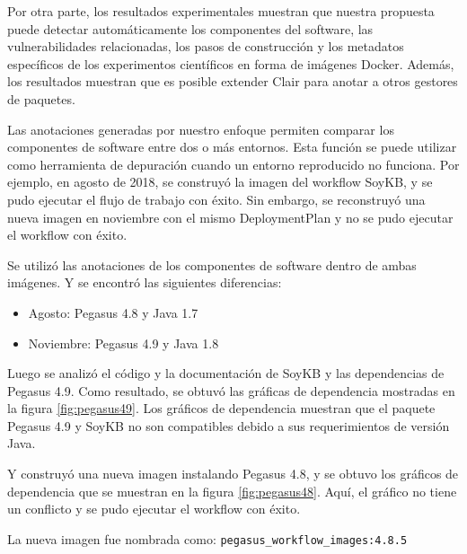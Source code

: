 Por otra parte, los resultados experimentales muestran que nuestra propuesta puede detectar automáticamente los componentes del software, las vulnerabilidades relacionadas, los pasos de construcción y los metadatos específicos de los experimentos científicos en forma de imágenes Docker. 
Además, los resultados muestran que es posible extender Clair para anotar a otros gestores de paquetes. 

Las anotaciones generadas por nuestro enfoque permiten comparar los componentes de software entre dos o más entornos. Esta función se puede utilizar como herramienta de depuración cuando un entorno reproducido no funciona.
Por ejemplo, en agosto de 2018, se construyó la imagen del workflow SoyKB, y se pudo ejecutar el flujo de trabajo con éxito. Sin embargo, se reconstruyó una nueva imagen en noviembre con el mismo DeploymentPlan y no se pudo ejecutar el workflow con éxito.


Se utilizó las anotaciones de los componentes de software dentro de ambas imágenes. Y se encontró las siguientes diferencias:
\begin{itemize}
    \item Agosto: Pegasus 4.8 y Java 1.7
    \item Noviembre: Pegasus 4.9 y Java 1.8
\end{itemize}

Luego se analizó el código y la documentación de SoyKB y las dependencias de Pegasus 4.9. Como resultado, se obtuvó las gráficas de dependencia mostradas en la figura \ref{fig:pegasus49}.  Los gráficos de dependencia muestran que el paquete Pegasus 4.9 y SoyKB no son compatibles debido a sus requerimientos de versión Java.

Y construyó una nueva imagen instalando Pegasus 4.8, y se obtuvo los gráficos de dependencia que se muestran en la figura \ref{fig:pegasus48}. Aquí, el gráfico no tiene un conflicto y se pudo ejecutar el workflow con éxito.

La nueva imagen fue nombrada como: \verb|pegasus_workflow_images:4.8.5|


